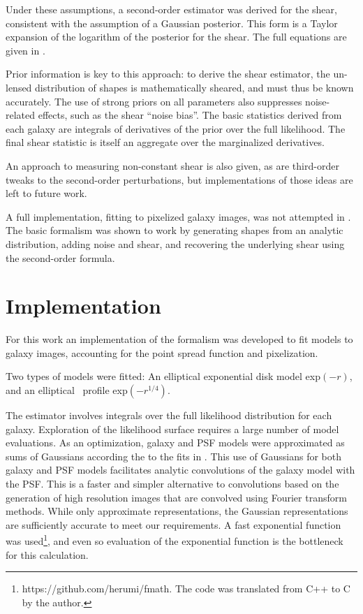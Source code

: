 \documentclass[12pt,preprint]{aastex}
\begin{document}
Under these assumptions, a second-order estimator was derived for the shear,
consistent with the assumption of a Gaussian posterior.  This form is a Taylor
expansion of the logarithm of the posterior for the shear.  The full equations
are given in \citet{ba13}.

Prior information is key to this approach: to derive the shear estimator, the
un-lensed distribution of shapes is mathematically sheared, and must thus be
known accurately.  The use of strong priors on all parameters also suppresses
noise-related effects, such as the shear ``noise bias''.  The basic statistics
derived from each galaxy are integrals of derivatives of the prior over the
full likelihood.  The final shear statistic is itself an aggregate over the
marginalized derivatives.

An approach to measuring non-constant shear is also given, as are third-order
tweaks to the second-order perturbations, but implementations of those ideas
are left to future work.

A full implementation, fitting to pixelized galaxy images, was not attempted in
\citet{ba13}.  The basic formalism was shown to work by generating shapes from
an analytic distribution, adding noise and shear, and recovering the underlying
shear using the second-order formula.

\section{Implementation} \label{sec:impl}

For this work an implementation of the \citet{ba13} formalism was developed to
fit models to galaxy images, accounting for the point spread function and
pixelization.

Two types of models were fitted: An elliptical exponential disk model exp$(-r)$,
and an elliptical \devauc\ profile exp$( -r^{1/4} )$.

The estimator involves integrals over the full likelihood distribution for each
galaxy.  Exploration of the likelihood surface requires a large number of model
evaluations.  As an optimization, galaxy and PSF models were approximated as
sums of Gaussians according the to the fits in \citet{HoggGMix12}.  This use of
Gaussians for both galaxy and PSF models facilitates analytic convolutions of
the galaxy model with the PSF.  This is a faster and simpler alternative to
convolutions based on the generation of high resolution images that are
convolved using Fourier transform methods. While only approximate
representations, the Gaussian representations are sufficiently accurate to meet
our requirements.  A fast exponential function was
used\footnote{https://github.com/herumi/fmath.  The code was translated from
    C++ to C by the author.}, and even so evaluation of the exponential
    function is the bottleneck for this calculation.
\end{document}
